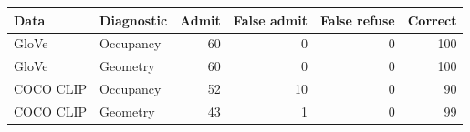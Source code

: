 \begin{tabular}{llrrrr}
\hline
Data & Diagnostic & Admit & False admit & False refuse & Correct \\
\hline
GloVe & Occupancy & 60 & 0 & 0 & 100 \\
GloVe & Geometry & 60 & 0 & 0 & 100 \\
COCO CLIP & Occupancy & 52 & 10 & 0 & 90 \\
COCO CLIP & Geometry & 43 & 1 & 0 & 99 \\
\hline
\end{tabular}
